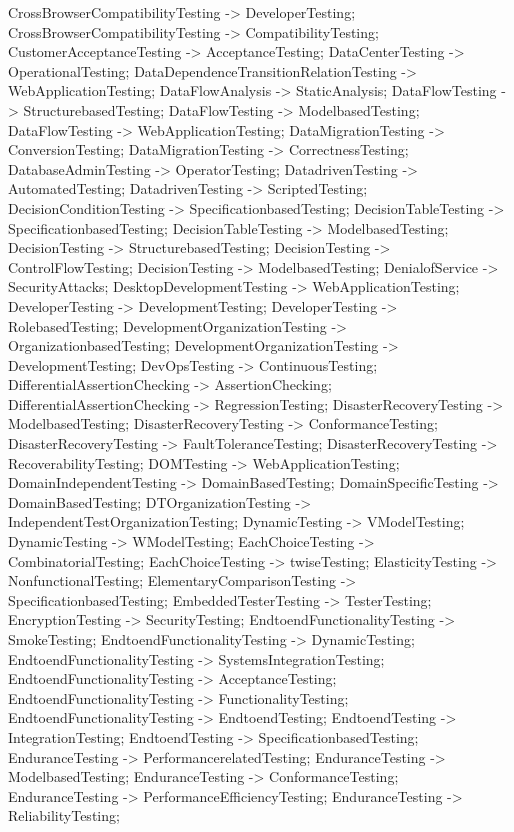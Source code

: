 \documentclass{article}
\begin{document}
{CrossBrowserCompatibilityTesting -> DeveloperTesting;
CrossBrowserCompatibilityTesting -> CompatibilityTesting;
CustomerAcceptanceTesting -> AcceptanceTesting;
DataCenterTesting -> OperationalTesting;
DataDependenceTransitionRelationTesting -> WebApplicationTesting;
DataFlowAnalysis -> StaticAnalysis;
DataFlowTesting -> StructurebasedTesting;
DataFlowTesting -> ModelbasedTesting;
DataFlowTesting -> WebApplicationTesting;
DataMigrationTesting -> ConversionTesting;
DataMigrationTesting -> CorrectnessTesting;
DatabaseAdminTesting -> OperatorTesting;
DatadrivenTesting -> AutomatedTesting;
DatadrivenTesting -> ScriptedTesting;
DecisionConditionTesting -> SpecificationbasedTesting;
DecisionTableTesting -> SpecificationbasedTesting;
DecisionTableTesting -> ModelbasedTesting;
DecisionTesting -> StructurebasedTesting;
DecisionTesting -> ControlFlowTesting;
DecisionTesting -> ModelbasedTesting;
DenialofService -> SecurityAttacks;
DesktopDevelopmentTesting -> WebApplicationTesting;
DeveloperTesting -> DevelopmentTesting;
DeveloperTesting -> RolebasedTesting;
DevelopmentOrganizationTesting -> OrganizationbasedTesting;
DevelopmentOrganizationTesting -> DevelopmentTesting;
DevOpsTesting -> ContinuousTesting;
DifferentialAssertionChecking -> AssertionChecking;
DifferentialAssertionChecking -> RegressionTesting;
DisasterRecoveryTesting -> ModelbasedTesting;
DisasterRecoveryTesting -> ConformanceTesting;
DisasterRecoveryTesting -> FaultToleranceTesting;
DisasterRecoveryTesting -> RecoverabilityTesting;
DOMTesting -> WebApplicationTesting;
DomainIndependentTesting -> DomainBasedTesting;
DomainSpecificTesting -> DomainBasedTesting;
DTOrganizationTesting -> IndependentTestOrganizationTesting;
DynamicTesting -> VModelTesting;
DynamicTesting -> WModelTesting;
EachChoiceTesting -> CombinatorialTesting;
EachChoiceTesting -> twiseTesting;
ElasticityTesting -> NonfunctionalTesting;
ElementaryComparisonTesting -> SpecificationbasedTesting;
EmbeddedTesterTesting -> TesterTesting;
EncryptionTesting -> SecurityTesting;
EndtoendFunctionalityTesting -> SmokeTesting;
EndtoendFunctionalityTesting -> DynamicTesting;
EndtoendFunctionalityTesting -> SystemsIntegrationTesting;
EndtoendFunctionalityTesting -> AcceptanceTesting;
EndtoendFunctionalityTesting -> FunctionalityTesting;
EndtoendFunctionalityTesting -> EndtoendTesting;
EndtoendTesting -> IntegrationTesting;
EndtoendTesting -> SpecificationbasedTesting;
EnduranceTesting -> PerformancerelatedTesting;
EnduranceTesting -> ModelbasedTesting;
EnduranceTesting -> ConformanceTesting;
EnduranceTesting -> PerformanceEfficiencyTesting;
EnduranceTesting -> ReliabilityTesting;
}
\end{document}
